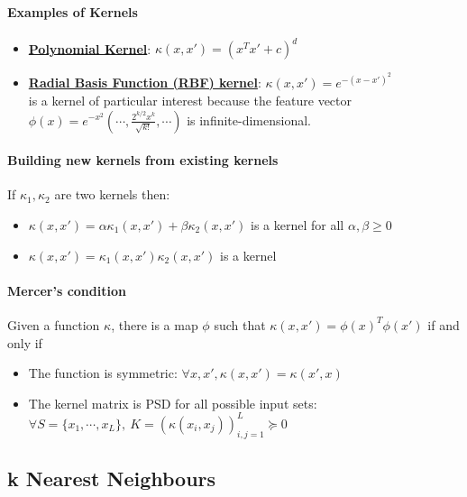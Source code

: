 \documentclass{article}
\begin{document}
\paragraph{Examples of Kernels}

\begin{itemize}
    \item \href{https://en.wikipedia.org/wiki/Polynomial_kernel}{\textbf{Polynomial Kernel}}: $\kappa(x, x') = (x^T x' + c)^d$
    \item \href{https://en.wikipedia.org/wiki/Radial_basis_function_kernel}{\textbf{Radial Basis Function (RBF) kernel}}: $\kappa(x, x') = e^{-(x-x')^2}$\\
	is a kernel of particular interest because the feature vector 
	$\phi(x) = e^{-x^2} \left( \cdots, \frac{2^{k/2} x^k}{\sqrt{k!}}, \cdots \right)$
	is infinite-dimensional.
\end{itemize}

\paragraph{Building new kernels from existing kernels}

If $\kappa_1, \kappa_2$ are two kernels then:
\begin{itemize}
    \item $\kappa(x, x') = \alpha \kappa_1(x, x') + \beta \kappa_2(x, x')$
	is a kernel for all $\alpha, \beta \geq 0$
    \item $\kappa(x, x') = \kappa_1(x, x') \kappa_2(x, x')$
	is a kernel
\end{itemize}

\paragraph{Mercer's condition}

Given a function $\kappa$, there is a map $\phi$ such that $\kappa(x, x') = \phi(x)^T \phi(x')$ if and only if
\begin{itemize}
    \item The function is symmetric: 
	$\forall x, x', \kappa(x, x') = \kappa(x', x)$
    \item The kernel matrix is PSD for all possible input sets:
	$\forall S = \{x_1, \cdots, x_L \}, \ K = (\kappa(x_i, x_j))_{i,j=1}^L \succeq 0$
\end{itemize}

\subsection{k Nearest Neighbours}
\end{document}
